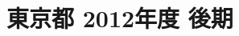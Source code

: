 \documentclass[../../hsm_tok_q.tex]{subfiles}
\begin{document}
    \section{東京都 2012年度 後期}
    \subsection{　}
    
    \newpage
    \subsection{　}
    
    \newpage
    \subsection{　}
    
    \newpage
    \subsection{　}
    
    \newpage
    \subsection{　}
    
\end{document}
